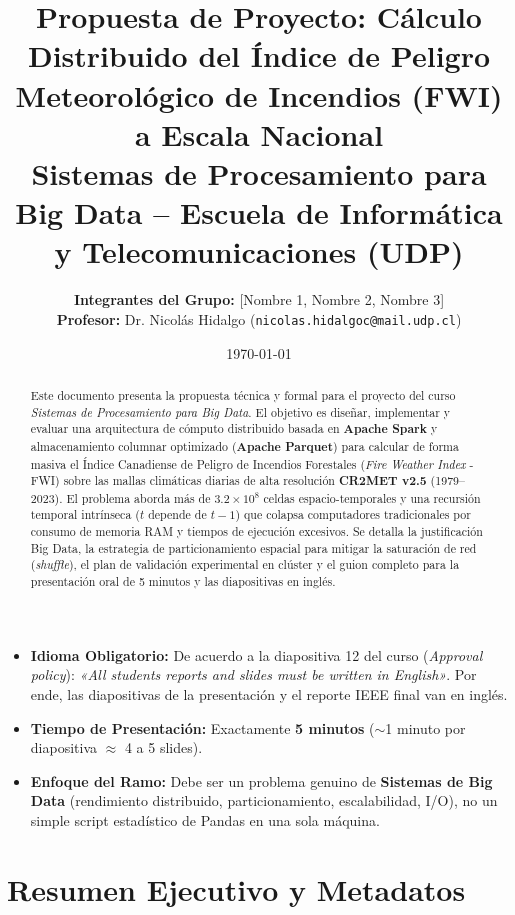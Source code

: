 \documentclass[11pt,a4paper]{article}
\title{
    \vspace{-1.5cm}
    \Huge\textbf{\color{primaryblue}Propuesta de Proyecto: Cálculo Distribuido del Índice de Peligro Meteorológico de Incendios (FWI) a Escala Nacional}\\[0.3em]
    \Large\color{darkgray}Sistemas de Procesamiento para Big Data -- Escuela de Informática y Telecomunicaciones (UDP)
}
\author{
    \textbf{Integrantes del Grupo:} [Nombre 1, Nombre 2, Nombre 3]\\[0.2em]
    \textbf{Profesor:} Dr. Nicolás Hidalgo (\texttt{nicolas.hidalgoc@mail.udp.cl})
}
\date{\today}
\begin{document}
\maketitle

\begin{abstract}
\noindent Este documento presenta la propuesta técnica y formal para el proyecto del curso \textit{Sistemas de Procesamiento para Big Data}. El objetivo es diseñar, implementar y evaluar una arquitectura de cómputo distribuido basada en \textbf{Apache Spark} y almacenamiento columnar optimizado (\textbf{Apache Parquet}) para calcular de forma masiva el Índice Canadiense de Peligro de Incendios Forestales (\textit{Fire Weather Index} - FWI) sobre las mallas climáticas diarias de alta resolución \textbf{CR2MET v2.5} (1979--2023). El problema aborda más de $3.2 \times 10^8$ celdas espacio-temporales y una recursión temporal intrínseca ($t$ depende de $t-1$) que colapsa computadores tradicionales por consumo de memoria RAM y tiempos de ejecución excesivos. Se detalla la justificación Big Data, la estrategia de particionamiento espacial para mitigar la saturación de red (\textit{shuffle}), el plan de validación experimental en clúster y el guion completo para la presentación oral de 5 minutos y las diapositivas en inglés.
\end{abstract}

\vspace{0.3cm}

\begin{warningbox}
\begin{itemize}[leftmargin=5mm, itemsep=1pt]
    \item \textbf{Idioma Obligatorio:} De acuerdo a la diapositiva 12 del curso (\textit{Approval policy}): \textit{«All students reports and slides must be written in English»}. Por ende, las diapositivas de la presentación y el reporte IEEE final van en inglés.
    \item \textbf{Tiempo de Presentación:} Exactamente \textbf{5 minutos} ($\sim$1 minuto por diapositiva $\approx$ 4 a 5 slides).
    \item \textbf{Enfoque del Ramo:} Debe ser un problema genuino de \textbf{Sistemas de Big Data} (rendimiento distribuido, particionamiento, escalabilidad, I/O), no un simple script estadístico de Pandas en una sola máquina.
\end{itemize}
\end{warningbox}

\section{Resumen Ejecutivo y Metadatos}
\end{document}
